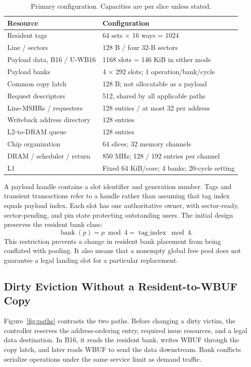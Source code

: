 \documentclass[conference,letterpaper]{IEEEtran}
\newcommand{\base}{B16}
\newcommand{\unif}{U-WB16}
\begin{document}
\begin{table}[t]
\caption{Primary configuration. Capacities are per slice unless stated.}
\label{tab:configuration}
\centering\footnotesize
\begin{tabularx}{\columnwidth}{@{}L{0.40\columnwidth}X@{}}
\toprule
Resource & Configuration \\
\midrule
Resident tags & 64 sets $\times$ 16 ways = 1024 \\
Line / sectors & 128 B / four 32-B sectors \\
Payload data, \base{} / \unif{} & 1168 slots = 146 KiB in either mode \\
Payload banks & 4 $\times$ 292 slots; 1 operation/bank/cycle \\
Common copy latch & 128 B; not allocatable as a payload \\
Request descriptors & 512, shared by all applicable paths \\
Line-MSHRs / requesters & 128 entries / at most 32 per address \\
Writeback address directory & 128 entries \\
L2-to-DRAM queue & 128 entries \\
Chip organization & 64 slices; 32 memory channels \\
DRAM / scheduler / return & 850 MHz; 128 / 192 entries per channel \\
L1 & Fixed 64 KiB/core; 4 banks; 20-cycle setting \\
\bottomrule
\end{tabularx}
\end{table}

A payload handle contains a slot identifier and generation number. Tags and transient transactions refer to a handle rather than assuming that tag index equals payload index. Each slot has one authoritative owner, with sector-ready, sector-pending, and pin state protecting outstanding users. The initial design preserves the resident bank class:
\begin{equation}
\operatorname{bank}(p)=p\bmod 4=\operatorname{tag\_index}\bmod 4.
\label{eq:bankclass}
\end{equation}
This restriction prevents a change in resident bank placement from being conflated with pooling. It also means that a nonempty global free pool does not guarantee a legal landing slot for a particular replacement.

\subsection{Dirty Eviction Without a Resident-to-WBUF Copy}
Figure~\ref{fig:paths} contrasts the two paths. Before changing a dirty victim, the controller reserves the address-ordering entry, required issue resources, and a legal data destination. In \base{}, it reads the resident bank, writes WBUF through the copy latch, and later reads WBUF to send the data downstream. Bank conflicts serialize operations under the same service limit as demand traffic.
\end{document}
